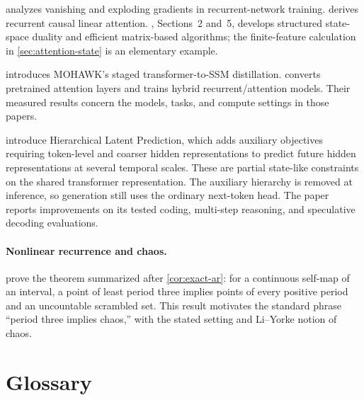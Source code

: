 \documentclass[11pt,twoside]{article}
\theoremstyle{definition}
\theoremstyle{remark}
\begin{document}
\citet{pascanu2013} analyzes vanishing and exploding gradients in
recurrent-network training. \citet{katharopoulos2020} derives recurrent
causal linear attention. \citet{dao2024}, Sections~2 and~5, develops
structured state-space duality and efficient matrix-based algorithms;
the finite-feature calculation in \cref{sec:attention-state} is an
elementary example.

\citet{bick2024} introduces MOHAWK's staged transformer-to-SSM distillation.
\citet{wang2024} converts pretrained attention layers and trains
hybrid recurrent/attention models. Their measured results concern the
models, tasks, and compute settings in those papers.

\citet{shi2026hilp} introduce Hierarchical Latent Prediction, which adds
auxiliary objectives requiring token-level and coarser hidden
representations to predict future hidden representations at several temporal
scales. These are partial state-like constraints on the shared transformer
representation. The auxiliary hierarchy is removed at inference, so
generation still uses the ordinary next-token head. The paper reports
improvements on its tested coding, multi-step reasoning, and speculative
decoding evaluations.

\paragraph{Nonlinear recurrence and chaos.}
\citet{li1975} prove the theorem summarized after
\cref{cor:exact-ar}: for a continuous self-map of an interval, a point of
least period three implies points of every positive period and an uncountable
scrambled set. This result motivates the standard phrase ``period three
implies chaos,'' with the stated setting and Li--Yorke notion of chaos.



\clearpage

\section*{Glossary}
\label{sec:glossary}
\end{document}
